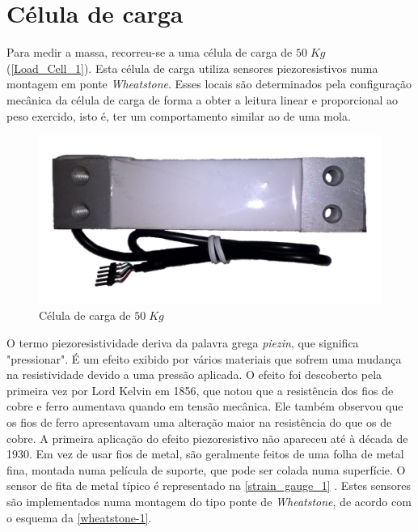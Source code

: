 \section{Célula de carga}
Para medir a massa, recorreu-se a uma célula de carga de $50 \; Kg$ (\autoref{Load_Cell_1}). Esta célula de carga utiliza sensores piezoresistivos numa montagem em ponte \textit{Wheatstone}. Esses locais são determinados pela configuração mecânica da célula de carga de forma a obter a leitura linear e proporcional ao peso exercido, isto é, ter um comportamento similar ao de uma mola.
\\
\begin{figure}[H]
	\centering
	\includegraphics[scale=0.15]{./image/PESTA/material/Load_Cell_1.jpg}
	\caption{Célula de carga de $50 \; Kg$}
	\label{Load_Cell_1}
\end{figure}
O termo piezoresistividade deriva da palavra grega \textit{piezin}, que significa "pressionar". É um efeito exibido por vários materiais que sofrem uma mudança na resistividade devido a uma pressão aplicada. O efeito foi descoberto pela primeira vez por Lord Kelvin em 1856, que notou que a resistência dos fios de cobre e ferro aumentava quando em tensão mecânica. Ele também observou que os fios de ferro apresentavam uma alteração maior na resistência do que os de cobre. 
A primeira aplicação do efeito piezoresistivo não apareceu até à década de 1930.
\emptyline
Em vez de usar fios de metal, são geralmente feitos de uma folha de metal fina, montada numa película de suporte, que pode ser colada numa superfície. O sensor de fita de metal típico é representado na \autoref{strain_gauge_1} \cite{book-9}.
Estes sensores são implementados numa montagem do tipo ponte de \textit{Wheatstone}, de acordo com o esquema da \autoref{wheatstone-1}.
\emptyline
